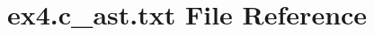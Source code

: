\hypertarget{ex4_8c__ast_8txt}{}\section{ex4.\+c\+\_\+ast.\+txt File Reference}
\label{ex4_8c__ast_8txt}
